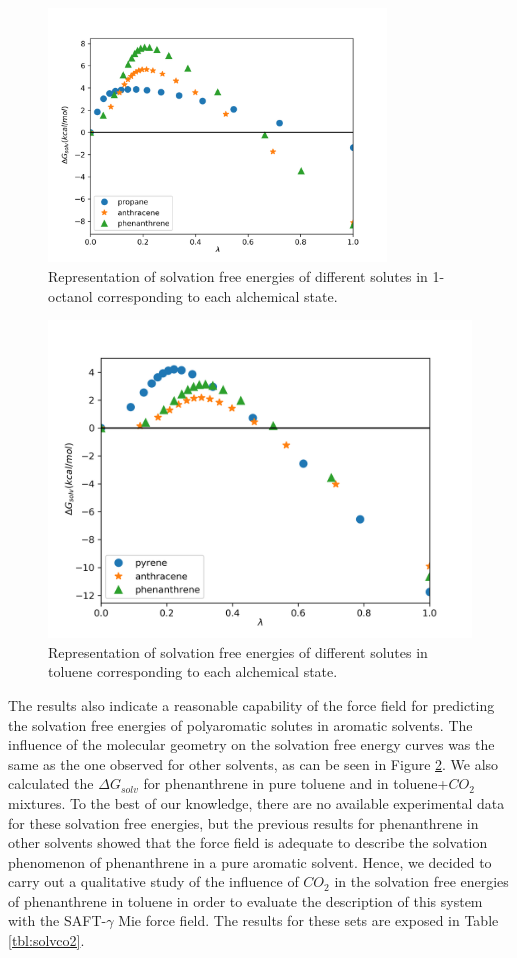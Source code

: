 \begin{figure}[H]
	\centering
	\includegraphics[width=0.8\textwidth]{Figures/oct}
	\caption{Representation of solvation free energies of different solutes in 1-octanol corresponding to each alchemical state.}
	\label{fig:oct}
\end{figure}

\begin{figure}[H]
	\centering
	\includegraphics[width=0.8\linewidth]{Figures/tol}
	\caption{Representation of solvation free energies of different solutes in toluene corresponding to each alchemical state. }
	\label{fig:tol}
\end{figure}

The results also indicate a reasonable capability of the force field for predicting the solvation free energies of polyaromatic solutes in aromatic solvents. The influence of the molecular geometry on the solvation free energy curves was the same as the one observed for other solvents, as can be seen in Figure \ref{fig:tol}.  We also calculated the $\Delta G_{solv}$ for phenanthrene in pure toluene and in toluene+$CO_{2}$ mixtures. To the best of our knowledge, there are no available experimental data for these solvation free energies, but the previous results for phenanthrene in other solvents showed that the force field is adequate to describe the solvation phenomenon of phenanthrene in a pure aromatic solvent. Hence, we decided to carry out a qualitative study of the influence of $CO_{2}$ in the solvation free energies of phenanthrene in toluene in order to evaluate the description of this system with the SAFT-$\gamma$ Mie force field. The results for these sets are exposed in Table \ref{tbl:solvco2}.  

